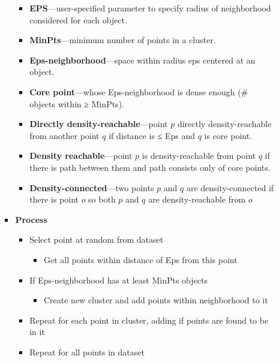 \begin{multicols}{2}
\begin{itemize}
\begin{itemize}
\begin{itemize}
      \begin{itemize}
            \item
        \textbf{EPS}---user-specified parameter to specify radius of
        neighborhood considered for each object.
      \item
        \textbf{MinPts}---minimum number of points in a cluster.
      \item
        \textbf{Eps-neighborhood}---space within radius eps centered at
        an object.
      \item
        \textbf{Core point}---whose Eps-neighborhood is dense enough (\#
        objects within ≥ MinPts).
      \item
        \textbf{Directly density-reachable}---point \(p\) directly
        density-reachable from another point \(q\) if distance is ≤ Eps
        and \(q\) is core point.
      \item
        \textbf{Density reachable}---point \(p\) is density-reachable
        from point \(q\) if there is path between them and path consists
        only of core points.
      \item
        \textbf{Density-connected}---two points \(p\) and \(q\) are
        density-connected if there is point \(o\) so both \(p\) and
        \(q\) are density-reachable from \(o\)
      \end{itemize}
    \item
      \textbf{Process}

      \begin{itemize}
            \item
        Select point at random from dataset

        \begin{itemize}
                \item
          Get all points within distance of Eps from this point
        \end{itemize}
      \item
        If Eps-neighborhood has at least MinPts objects

        \begin{itemize}
                \item
          Create new cluster and add points within neighborhood to it
        \end{itemize}
      \item
        Repeat for each point in cluster, adding if points are found to
        be in it
      \item
        Repeat for all points in dataset


\end{itemize}
\end{itemize}
\end{itemize}
\end{itemize}
\end{multicols}
